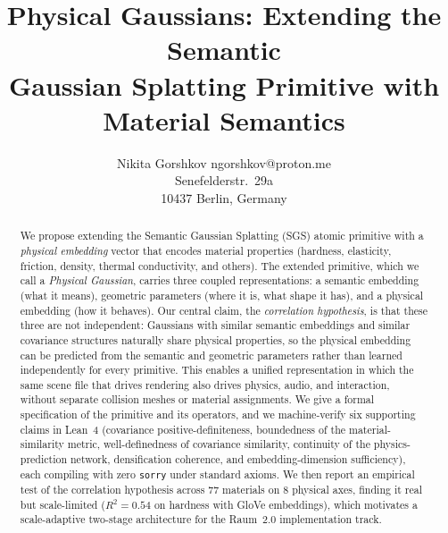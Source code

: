 \documentclass[twoside,11pt]{article}
\begin{document}
\title{Physical Gaussians: Extending the Semantic\\
Gaussian Splatting Primitive with Material Semantics}

\author{\name Nikita Gorshkov \email ngorshkov@proton.me \\
       \addr Senefelderstr.\ 29a\\
       10437 Berlin, Germany}

\editor{}

\maketitle

\begin{abstract}%
We propose extending the Semantic Gaussian Splatting (SGS) atomic primitive with a \emph{physical embedding} vector that encodes material properties (hardness, elasticity, friction, density, thermal conductivity, and others). The extended primitive, which we call a \emph{Physical Gaussian}, carries three coupled representations: a semantic embedding (what it means), geometric parameters (where it is, what shape it has), and a physical embedding (how it behaves). Our central claim, the \emph{correlation hypothesis}, is that these three are not independent: Gaussians with similar semantic embeddings and similar covariance structures naturally share physical properties, so the physical embedding can be predicted from the semantic and geometric parameters rather than learned independently for every primitive. This enables a unified representation in which the same scene file that drives rendering also drives physics, audio, and interaction, without separate collision meshes or material assignments. We give a formal specification of the primitive and its operators, and we machine-verify six supporting claims in Lean~4 (covariance positive-definiteness, boundedness of the material-similarity metric, well-definedness of covariance similarity, continuity of the physics-prediction network, densification coherence, and embedding-dimension sufficiency), each compiling with zero \texttt{sorry} under standard axioms. We then report an empirical test of the correlation hypothesis across 77 materials on 8 physical axes, finding it real but scale-limited ($R^2 = 0.54$ on hardness with GloVe embeddings), which motivates a scale-adaptive two-stage architecture for the Raum~2.0 implementation track.
\end{abstract}
\end{document}
